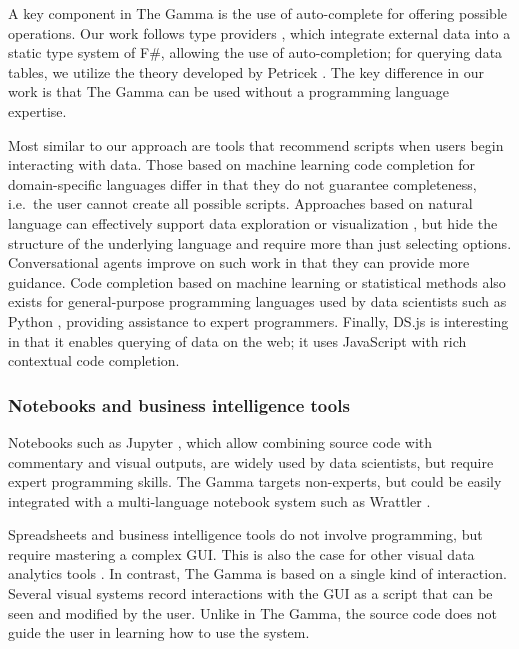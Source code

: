 \documentclass[manuscript,review,anonymous]{acmart}
\begin{document}
A key component in The Gamma is the use of auto-complete for offering possible operations.
Our work follows type providers \cite{inforich,fsdata}, which integrate external data into a
static type system of F\#, allowing the use of auto-completion; for querying data tables, we utilize
the theory developed by Petricek \cite{dotdriven}. The key difference in our work is that The Gamma
can be used without a programming language expertise.

Most similar to our approach are tools that recommend scripts when users begin interacting
with data. Those based on machine learning code completion for domain-specific languages \cite{predictive,proactive}
differ in that they do not guarantee completeness, i.e.~the user cannot create all possible
scripts. Approaches based on natural language can effectively support data exploration
or visualization \cite{eviza,codemend}, but hide the structure of the underlying language and
require more than just selecting options. Conversational agents \cite{iris} improve on such work
in that they can provide more guidance. Code completion based on machine learning or statistical
methods \cite{mlcomplete,statcomplete} also exists for general-purpose programming languages used
by data scientists such as Python \cite{pythia}, providing assistance to expert programmers.
Finally, DS.js \cite{dsjs} is interesting in that it enables querying of data on the
web; it uses JavaScript with rich contextual code completion.

\subsubsection*{Notebooks and business intelligence tools}

Notebooks such as Jupyter \cite{jupyter}, which allow combining source code with commentary and
visual outputs, are widely used by data scientists, but require expert programming skills.
The Gamma targets non-experts, but could be easily integrated with a multi-language notebook system
such as Wrattler \cite{wrattler}.

Spreadsheets and business intelligence tools \cite{tableau,powerbi} do
not involve programming, but require mastering a complex GUI. This is also the case
for other visual data analytics tools \cite{control,vizdom}. In contrast, The Gamma is
based on a single kind of interaction. Several visual systems \cite{potter,wrangler,lyra} record
interactions with the GUI as a script that can be seen and modified by the user.
Unlike in The Gamma, the source code does not guide the user in learning how to use the system.
\end{document}

